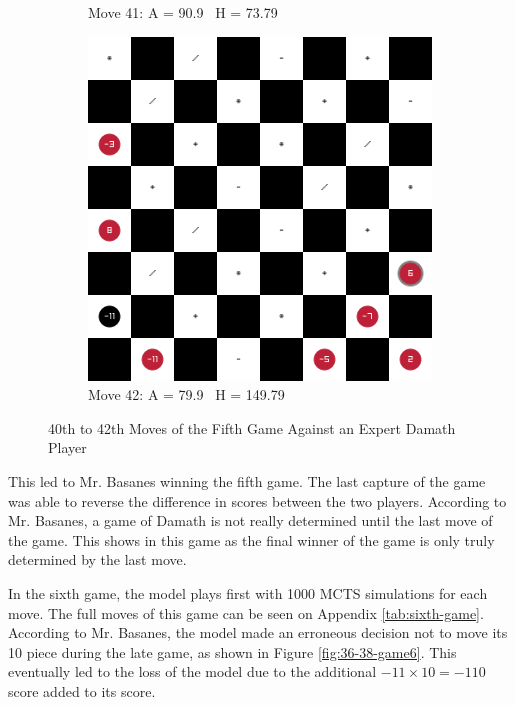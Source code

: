 \begin{figure}[H]
\begin{subfigure}{0.3\textwidth}
        \caption*{Move 41: A = 90.9 \textbar\ H = 73.79}
    \end{subfigure}
    \quad
    \begin{subfigure}{0.3\textwidth}
        \centering
        \includegraphics[width=\textwidth]{images/games/game5/move_42.png}
        \caption*{Move 42: A = 79.9 \textbar\ H = 149.79}
    \end{subfigure}
    \caption{40th to 42th Moves of the Fifth Game Against an Expert Damath Player}
    \label{fig:40-42-game5}
\end{figure}

This led to Mr. Basanes winning the fifth game. The last capture of the game was able to reverse the difference in scores between the two players. According to Mr. Basanes, a game of Damath is not really determined until the last move of the game. This shows in this game as the final winner of the game is only truly determined by the last move.

In the sixth game, the model plays first with 1000 MCTS simulations for each move. The full moves of this game can be seen on Appendix \ref{tab:sixth-game}. According to Mr. Basanes, the model made an erroneous decision not to move its 10 piece during the late game, as shown in Figure \ref{fig:36-38-game6}. This eventually led to the loss of the model due to the additional $-11 \times 10 = -110$ score added to its score.

